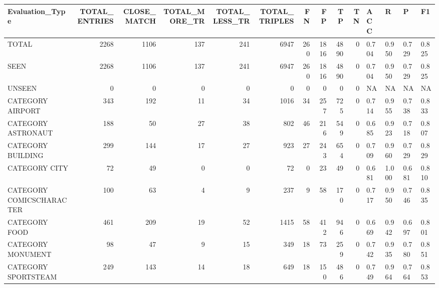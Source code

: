\begin{tabular}{lrrrrrrrrrllll}
\hline
 Evaluation\_Type          &   TOTAL\_ENTRIES &   CLOSE\_MATCH &   TOTAL\_MORE\_TR &   TOTAL\_LESS\_TR &   TOTAL\_TRIPLES &   FN &   FP &   TP &   TN & ACC   & R     & P     & F1    \\
\hline
 TOTAL                    &            2268 &          1106 &             137 &             241 &            6947 &  260 & 1816 & 4890 &    0 & 0.704 & 0.950 & 0.729 & 0.825 \\
 SEEN                     &            2268 &          1106 &             137 &             241 &            6947 &  260 & 1816 & 4890 &    0 & 0.704 & 0.950 & 0.729 & 0.825 \\
 UNSEEN                   &               0 &             0 &               0 &               0 &               0 &    0 &    0 &    0 &    0 & NA    & NA    & NA    & NA    \\
 CATEGORY AIRPORT         &             343 &           192 &              11 &              34 &            1016 &   34 &  257 &  725 &    0 & 0.714 & 0.955 & 0.738 & 0.833 \\
 CATEGORY ASTRONAUT       &             188 &            50 &              27 &              38 &             802 &   46 &  216 &  549 &    0 & 0.685 & 0.923 & 0.718 & 0.807 \\
 CATEGORY BUILDING        &             299 &           144 &              17 &              27 &             923 &   27 &  243 &  654 &    0 & 0.709 & 0.960 & 0.729 & 0.829 \\
 CATEGORY CITY            &              72 &            49 &               0 &               0 &              72 &    0 &   23 &   49 &    0 & 0.681 & 1.000 & 0.681 & 0.810 \\
 CATEGORY COMICSCHARACTER &             100 &            63 &               4 &               9 &             237 &    9 &   58 &  170 &    0 & 0.717 & 0.950 & 0.746 & 0.835 \\
 CATEGORY FOOD            &             461 &           209 &              19 &              52 &            1415 &   58 &  412 &  946 &    0 & 0.669 & 0.942 & 0.697 & 0.801 \\
 CATEGORY MONUMENT        &              98 &            47 &               9 &              15 &             349 &   18 &   73 &  259 &    0 & 0.742 & 0.935 & 0.780 & 0.851 \\
 CATEGORY SPORTSTEAM      &             249 &           143 &              14 &              18 &             649 &   18 &  150 &  486 &    0 & 0.749 & 0.964 & 0.764 & 0.853 \\

\end{tabular}
